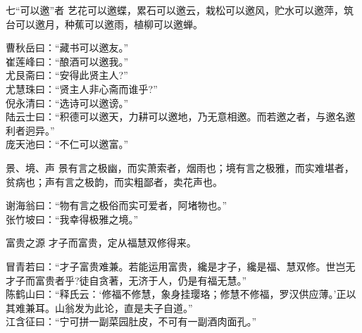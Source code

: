 \begin{yulu}{七“可以邀”者}
艺花可以邀蝶，累石可以邀云，栽松可以邀风，贮水可以邀萍，筑台可以邀月，种蕉可以邀雨，植柳可以邀蝉。
\begin{comments}
曹秋岳曰：“藏书可以邀友。” \\
崔莲峰曰：“酿酒可以邀我。” \\
尤艮斋曰：“安得此贤主人?” \\
尤慧珠曰：“贤主人非心斋而谁乎?” \\
倪永清曰：“选诗可以邀谤。” \\
陆云士曰：“积德可以邀天，力耕可以邀地，乃无意相邀。而若邀之者，与邀名邀利者迥异。” \\
庞天池曰：“不仁可以邀富。”
\end{comments}
\end{yulu}

\begin{yulu}{景、境、声}
景有言之极幽，而实萧索者，烟雨也；境有言之极雅，而实难堪者，贫病也；声有言之极韵，而实粗鄙者，卖花声也。
\begin{comments}
谢海翁曰：“物有言之极俗而实可爱者，阿堵物也。” \\
张竹坡曰：“我幸得极雅之境。”
\end{comments}
\end{yulu}

\begin{yulu}{富贵之源}
才子而富贵，定从福慧双修得来。
\begin{comments}
冒青若曰：“才子富贵难兼。若能运用富贵，纔是才子，纔是福、慧双修。世岂无才子而富贵者乎?徒自贪著，无济于人，仍是有福无慧。” \\
陈鹤山曰：“释氏云：‘修福不修慧，象身挂璎珞；修慧不修福，罗汉供应薄。’正以其难兼耳。山翁发为此论，直是夫子自道。” \\
江含征曰：“宁可拼一副菜园肚皮，不可有一副酒肉面孔。”
\end{comments}
\end{yulu}

\begin{yulu}{}

\begin{comments}

\end{comments}
\end{yulu}

\begin{yulu}{}

\begin{comments}

\end{comments}
\end{yulu}

